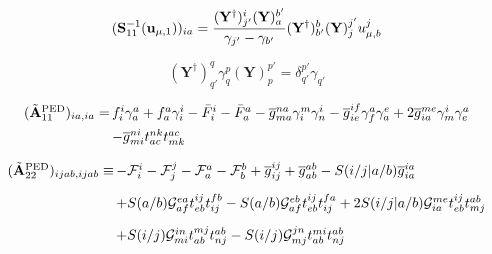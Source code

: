 \begin{subappendices}
\begin{equation}
    (\mathbf{S}_{11}^{-1}(\mathbf{u}_{\mu,1}))_{ia}
    =
    \frac{%
        (\mathbf{Y}^\dagger)_{j'}^i
        (\mathbf{Y})_a^{b'}
    }{%
        \gamma_{j'}-\gamma_{b'}
    }
    (\mathbf{Y}^\dagger)_{b'}^b
    (\mathbf{Y})_j^{j'}
    u_{\mu,b}^j
\end{equation}

\begin{equation}
    (\mathbf{Y}^\dagger)_{q'}^q
    \gamma_q^p
    (\mathbf{Y})_p^{p'}
    =
    \delta_{q'}^{p'}
    \gamma_{q'}
\end{equation}

\begin{equation}
    \begin{array}{r@{\,}l}
        (\tilde{\mathbf{A}}_{11}^\mathrm{PED})_{ia,ia}
        =
        &
        f_i^i
        \gamma_a^a
        +
        f_a^a
        \gamma_i^i
        -
        \bar{F}_i^i
        -
        \bar{F}_a^a
        -
        \overline{g}_{ma}^{na}
        \gamma_i^m
        \gamma_n^i
        -
        \overline{g}_{ie}^{if}
        \gamma_f^a
        \gamma_a^e
        +
        2
        \overline{g}_{ia}^{me}
        \gamma_m^i
        \gamma_e^a
        \\[5pt]
        &
        -
        \overline{g}_{mi}^{ni}
        t_{ac}^{nk}
        t_{mk}^{ac}
    \end{array}
\end{equation}

\begin{equation}
    \begin{array}{r@{\,}l}
        (\tilde{\mathbf{A}}_{22}^\mathrm{PED})_{ijab,ijab}
        \equiv
        &
        -
        \mathcal{F}_i^i
        -
        \mathcal{F}_j^j
        -
        \mathcal{F}_a^a
        -
        \mathcal{F}_b^b
        +
        \overline{g}_{ij}^{ij}
        +
        \overline{g}_{ab}^{ab}
        -
        S(i/j|a/b)
        \overline{g}_{ia}^{ia}
        \\[10pt]
        &
        +
        S(a/b)
        \mathcal{G}_{af}^{ea}
        t_{eb}^{ij}
        t_{ij}^{fb}
        -
        S(a/b)
        \mathcal{G}_{af}^{eb}
        t_{eb}^{ij}
        t_{ij}^{fa}
        +
        2
        S(i/j|a/b)
        \mathcal{G}_{ia}^{me}
        t_{eb}^{ij}
        t_{mj}^{ab}
        \\[10pt]
        &
        +
        S(i/j)
        \mathcal{G}_{mi}^{in}
        t_{ab}^{mj}
        t_{nj}^{ab}
        -
        S(i/j)
        \mathcal{G}_{mj}^{jn}
        t_{ab}^{mi}
        t_{nj}^{ab}
    \end{array}
\end{equation}


\end{subappendices}
